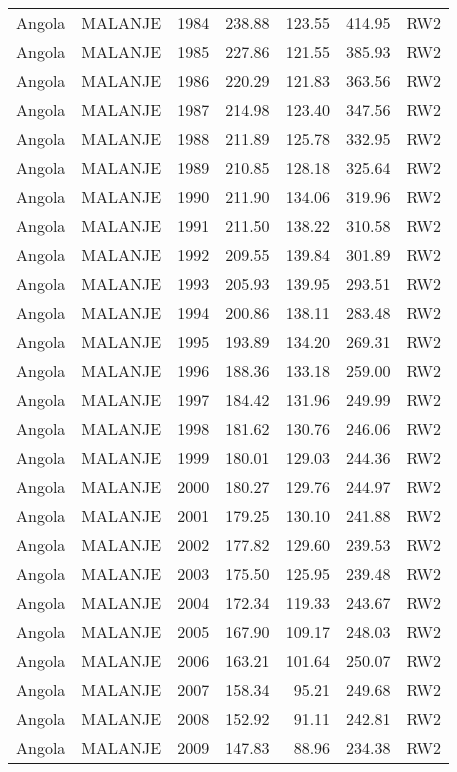 \begin{longtable}{lllrrrl}
  Angola & MALANJE & 1984 & 238.88 & 123.55 & 414.95 & RW2 \\ 
  Angola & MALANJE & 1985 & 227.86 & 121.55 & 385.93 & RW2 \\ 
  Angola & MALANJE & 1986 & 220.29 & 121.83 & 363.56 & RW2 \\ 
  Angola & MALANJE & 1987 & 214.98 & 123.40 & 347.56 & RW2 \\ 
  Angola & MALANJE & 1988 & 211.89 & 125.78 & 332.95 & RW2 \\ 
  Angola & MALANJE & 1989 & 210.85 & 128.18 & 325.64 & RW2 \\ 
  Angola & MALANJE & 1990 & 211.90 & 134.06 & 319.96 & RW2 \\ 
  Angola & MALANJE & 1991 & 211.50 & 138.22 & 310.58 & RW2 \\ 
  Angola & MALANJE & 1992 & 209.55 & 139.84 & 301.89 & RW2 \\ 
  Angola & MALANJE & 1993 & 205.93 & 139.95 & 293.51 & RW2 \\ 
  Angola & MALANJE & 1994 & 200.86 & 138.11 & 283.48 & RW2 \\ 
  Angola & MALANJE & 1995 & 193.89 & 134.20 & 269.31 & RW2 \\ 
  Angola & MALANJE & 1996 & 188.36 & 133.18 & 259.00 & RW2 \\ 
  Angola & MALANJE & 1997 & 184.42 & 131.96 & 249.99 & RW2 \\ 
  Angola & MALANJE & 1998 & 181.62 & 130.76 & 246.06 & RW2 \\ 
  Angola & MALANJE & 1999 & 180.01 & 129.03 & 244.36 & RW2 \\ 
  Angola & MALANJE & 2000 & 180.27 & 129.76 & 244.97 & RW2 \\ 
  Angola & MALANJE & 2001 & 179.25 & 130.10 & 241.88 & RW2 \\ 
  Angola & MALANJE & 2002 & 177.82 & 129.60 & 239.53 & RW2 \\ 
  Angola & MALANJE & 2003 & 175.50 & 125.95 & 239.48 & RW2 \\ 
  Angola & MALANJE & 2004 & 172.34 & 119.33 & 243.67 & RW2 \\ 
  Angola & MALANJE & 2005 & 167.90 & 109.17 & 248.03 & RW2 \\ 
  Angola & MALANJE & 2006 & 163.21 & 101.64 & 250.07 & RW2 \\ 
  Angola & MALANJE & 2007 & 158.34 & 95.21 & 249.68 & RW2 \\ 
  Angola & MALANJE & 2008 & 152.92 & 91.11 & 242.81 & RW2 \\ 
  Angola & MALANJE & 2009 & 147.83 & 88.96 & 234.38 & RW2 \\ 

\end{longtable}

